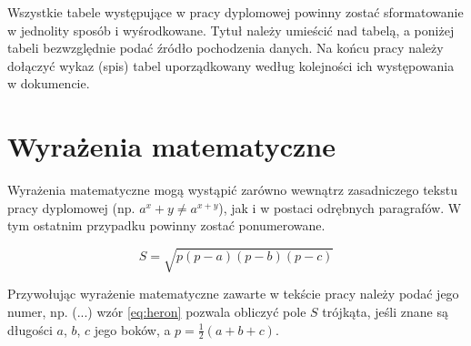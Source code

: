 Wszystkie tabele występujące w pracy dyplomowej powinny zostać sformatowanie w jednolity sposób i wyśrodkowane. Tytuł należy umieścić nad tabelą, a poniżej tabeli bezwzględnie podać źródło pochodzenia danych. Na końcu pracy należy dołączyć wykaz (spis) tabel uporządkowany według kolejności ich występowania w dokumencie.



\section{Wyrażenia matematyczne}

Wyrażenia matematyczne mogą wystąpić zarówno wewnątrz zasadniczego tekstu pracy dyplomowej (np. $a^x+y \neq a^{x+y}$), jak i w postaci odrębnych paragrafów. W tym ostatnim przypadku powinny zostać ponumerowane.

\begin{equation}
S=\sqrt{p(p-a)(p-b)(p-c)}
\label{eq:heron}
\end{equation}

Przywołując wyrażenie matematyczne zawarte w tekście pracy należy podać jego numer, np. (...) wzór \ref{eq:heron} pozwala obliczyć pole $S$ trójkąta, jeśli znane są długości $a$, $b$, $c$ jego boków, a $p=\frac{1}{2}(a+b+c)$.



